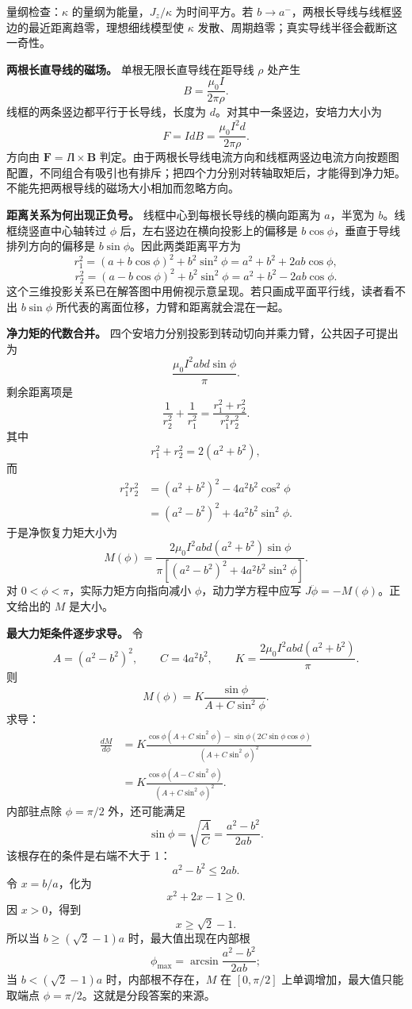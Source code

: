 \documentclass[12pt,a4paper,UTF8]{ctexart}
\begin{document}
量纲检查：\(\kappa\) 的量纲为能量，\(J_z/\kappa\) 为时间平方。若
\(b\to a^-\)，两根长导线与线框竖边的最近距离趋零，理想细线模型使
\(\kappa\) 发散、周期趋零；真实导线半径会截断这一奇性。

\textbf{两根长直导线的磁场。} 单根无限长直导线在距导线 \(\rho\) 处产生
\[
B=\frac{\mu_0I}{2\pi\rho}.
\] 线框的两条竖边都平行于长导线，长度为
\(d\)。对其中一条竖边，安培力大小为 \[
F=I d B
=\frac{\mu_0I^2d}{2\pi\rho}.
\] 方向由 \(\bm F=I\bm l\times\bm B\)
判定。由于两根长导线电流方向和线框两竖边电流方向按题图配置，不同组合有吸引也有排斥；把四个力分别对转轴取矩后，才能得到净力矩。不能先把两根导线的磁场大小相加而忽略方向。

\textbf{距离关系为何出现正负号。} 线框中心到每根长导线的横向距离为
\(a\)，半宽为 \(b\)。线框绕竖直中心轴转过 \(\phi\)
后，左右竖边在横向投影上的偏移是
\(b\cos\phi\)，垂直于导线排列方向的偏移是
\(b\sin\phi\)。因此两类距离平方为 \[
r_1^2=(a+b\cos\phi)^2+b^2\sin^2\phi
=a^2+b^2+2ab\cos\phi,
\] \[
r_2^2=(a-b\cos\phi)^2+b^2\sin^2\phi
=a^2+b^2-2ab\cos\phi.
\]
这个三维投影关系已在解答图中用俯视示意呈现。若只画成平面平行线，读者看不出
\(b\sin\phi\) 所代表的离面位移，力臂和距离就会混在一起。

\textbf{净力矩的代数合并。}
四个安培力分别投影到转动切向并乘力臂，公共因子可提出为 \[
\frac{\mu_0I^2abd\sin\phi}{\pi}.
\] 剩余距离项是 \[
\frac1{r_2^2}+\frac1{r_1^2}
=\frac{r_1^2+r_2^2}{r_1^2r_2^2}.
\] 其中 \[
r_1^2+r_2^2=2(a^2+b^2),
\] 而 \[
\begin{aligned}
r_1^2r_2^2
&=(a^2+b^2)^2-4a^2b^2\cos^2\phi\\
&=(a^2-b^2)^2+4a^2b^2\sin^2\phi.
\end{aligned}
\] 于是净恢复力矩大小为 \[
M(\phi)=
\frac{2\mu_0I^2abd(a^2+b^2)\sin\phi}
{\pi[(a^2-b^2)^2+4a^2b^2\sin^2\phi]}.
\] 对 \(0<\phi<\pi\)，实际力矩方向指向减小 \(\phi\)，动力学方程中应写
\(J\ddot\phi=-M(\phi)\)。正文给出的 \(M\) 是大小。

\textbf{最大力矩条件逐步求导。} 令 \[
A=(a^2-b^2)^2,\qquad C=4a^2b^2,\qquad
K=\frac{2\mu_0I^2abd(a^2+b^2)}\pi.
\] 则 \[
M(\phi)=K\frac{\sin\phi}{A+C\sin^2\phi}.
\] 求导： \[
\begin{aligned}
\frac{dM}{d\phi}
&=K\frac{
\cos\phi(A+C\sin^2\phi)
-\sin\phi(2C\sin\phi\cos\phi)}
{(A+C\sin^2\phi)^2}\\
&=K\frac{\cos\phi(A-C\sin^2\phi)}
{(A+C\sin^2\phi)^2}.
\end{aligned}
\] 内部驻点除 \(\phi=\pi/2\) 外，还可能满足 \[
\sin\phi=\sqrt{\frac AC}
=\frac{a^2-b^2}{2ab}.
\] 该根存在的条件是右端不大于 1： \[
a^2-b^2\le2ab.
\] 令 \(x=b/a\)，化为 \[
x^2+2x-1\ge0.
\] 因 \(x>0\)，得到 \[
x\ge\sqrt2-1.
\] 所以当 \(b\ge(\sqrt2-1)a\) 时，最大值出现在内部根 \[
\phi_{\max}=\arcsin\frac{a^2-b^2}{2ab};
\] 当 \(b<(\sqrt2-1)a\) 时，内部根不存在，\(M\) 在 \([0,\pi/2]\)
上单调增加，最大值只能取端点 \(\phi=\pi/2\)。这就是分段答案的来源。
\end{document}
